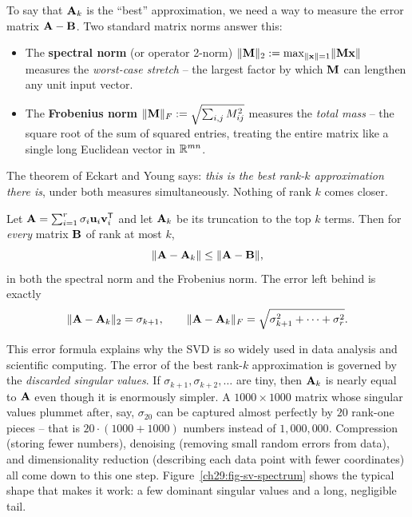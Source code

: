 To say that $\mathbf{A}_k$ is the ``best'' approximation, we need a way to
measure the error matrix $\mathbf{A} - \mathbf{B}$. Two standard matrix norms answer
this:
\begin{itemize}
  \item The \textbf{spectral norm} (or operator 2-norm) $\lVert\mathbf{M}\rVert_2 := \max_{\lVert\mathbf{x}\rVert=1}\lVert\mathbf{M}\mathbf{x}\rVert$
        measures the \emph{worst-case stretch} -- the largest factor by which $\mathbf{M}$
        can lengthen any unit input vector.
  \item The \textbf{Frobenius norm} $\lVert\mathbf{M}\rVert_F := \sqrt{\sum_{i,j} M_{ij}^2}$
        measures the \emph{total mass} -- the square root of the sum of squared
        entries, treating the entire matrix like a single long Euclidean vector in $\mathbb{R}^{mn}$.
\end{itemize}
The theorem of Eckart and Young says: \emph{this is the best rank-$k$
approximation there is}, under both measures simultaneously. Nothing of rank $k$ comes closer.

\begin{formalbox}
\begin{theorem}
\label{ch29:thm-eckart-young}
Let $\mathbf{A} = \sum_{i=1}^r \sigma_i \mathbf{u}_i\mathbf{v}_i^{\mathsf{T}}$ and let $\mathbf{A}_k$ be
its truncation to the top $k$ terms. Then for \emph{every} matrix $\mathbf{B}$ of
rank at most $k$,
\[
  \lVert\mathbf{A} - \mathbf{A}_k\rVert \le \lVert\mathbf{A} - \mathbf{B}\rVert,
\]
in both the spectral norm and the Frobenius norm. The error left behind is
exactly
\[
  \lVert\mathbf{A} - \mathbf{A}_k\rVert_{2} = \sigma_{k+1}, \qquad
  \lVert\mathbf{A} - \mathbf{A}_k\rVert_{F} = \sqrt{\sigma_{k+1}^2 + \cdots + \sigma_r^2}.
\]
\end{theorem}
\end{formalbox}

This error formula explains why the SVD is so widely used in data
analysis and scientific computing. The error of the best rank-$k$ approximation is governed by the
\emph{discarded singular values}. If $\sigma_{k+1}, \sigma_{k+2}, \dots$ are tiny,
then $\mathbf{A}_k$ is nearly equal to $\mathbf{A}$ even though it is enormously
simpler. A $1000\times 1000$ matrix whose singular values plummet after, say,
$\sigma_{20}$ can be captured almost perfectly by $20$ rank-one pieces -- that is
$20\cdot(1000 + 1000)$ numbers instead of $1{,}000{,}000$. Compression (storing
fewer numbers), denoising (removing small random errors from data), and
dimensionality reduction (describing each data point with fewer coordinates)
all come down to this one step.
Figure~\ref{ch29:fig-sv-spectrum} shows the typical shape that makes it work: a
few dominant singular values and a long, negligible tail.

